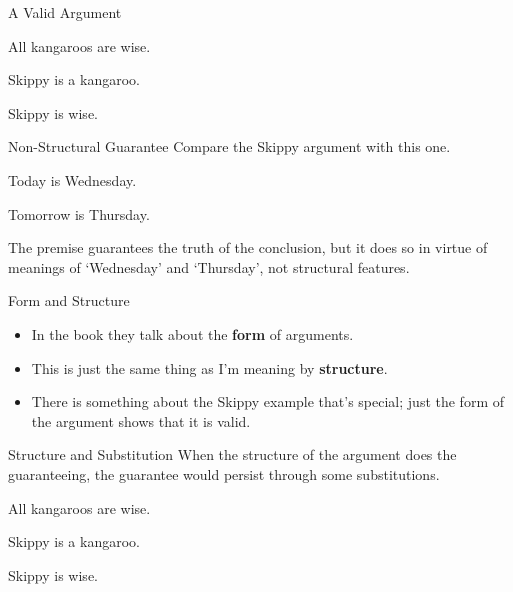 \documentclass[
  ignorenonframetext,
]{beamer}
\providecommand{\tightlist}{%
  \setlength{\itemsep}{0pt}\setlength{\parskip}{0pt}}
\renewcommand{\,}{\text{, }}
\begin{document}
\begin{frame}{A Valid Argument}
\protect\hypertarget{a-valid-argument}{}
\begin{description}
\tightlist
\item[~]
All kangaroos are wise.
\item[~]
Skippy is a kangaroo.
\item[\(\therefore\)]
Skippy is wise.
\end{description}
\end{frame}

\begin{frame}{Non-Structural Guarantee}
\protect\hypertarget{non-structural-guarantee}{}
Compare the Skippy argument with this one.

\begin{description}
\tightlist
\item[~]
Today is Wednesday.
\item[\(\therefore\)]
Tomorrow is Thursday.
\end{description}

The premise guarantees the truth of the conclusion, but it does so in
virtue of meanings of `Wednesday' and `Thursday', not structural
features.
\end{frame}

\begin{frame}{Form and Structure}
\protect\hypertarget{form-and-structure}{}
\begin{itemize}
\tightlist
\item
  In the book they talk about the \textbf{form} of arguments.
\item
  This is just the same thing as I'm meaning by \textbf{structure}.
\item
  There is something about the Skippy example that's special; just the
  form of the argument shows that it is valid.
\end{itemize}
\end{frame}

\begin{frame}{Structure and Substitution}
\protect\hypertarget{structure-and-substitution}{}
When the structure of the argument does the guaranteeing, the guarantee
would persist through some substitutions.

\begin{description}
\tightlist
\item[~]
All kangaroos are wise.
\item[~]
Skippy is a kangaroo.
\item[\(\therefore\)]
Skippy is wise.
\end{description}
\end{frame}
\end{document}
